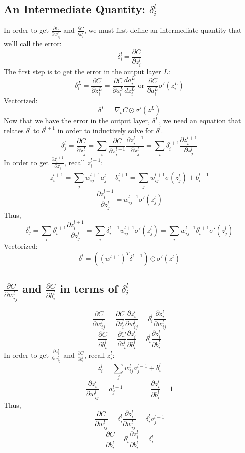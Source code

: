 \documentclass[11pt]{article}
\begin{document}
\subsection{An Intermediate Quantity: $\delta_i^l$}
In order to get $\frac{\partial C}{\partial w_{ij}^l}$ and $\frac{\partial C}{\partial b_i^l}$, we must first define an intermediate quantity that we'll call the error:
\[\delta_i^l = \frac{\partial C}{\partial z_i^l}\]
The first step is to get the error in the output layer $L$:
\[\delta_i^L = \frac{\partial C}{\partial z_i^L} = \frac{\partial C}{\partial a_i^L} \frac{d a_i^L}{d z_i^L} \text{ or } \frac{\partial C}{\partial a_i^L} \sigma'(z_i^L)\]
Vectorized:
\[\delta^L = \nabla_a C \odot \sigma'(z^L)\]
Now that we have the error in the output layer, $\delta^L$, we need an equation that relates $\delta^l$ to $\delta^{l + 1}$ in order to inductively solve for $\delta^l$.
\[\delta_j^l = \frac{\partial C}{\partial z_j^l} = \sum_i \frac{\partial C}{\partial z_i^{l + 1}} \frac{\partial z_i^{l + 1}}{\partial z_j^l} = \sum_i \delta_i^{l + 1} \frac{\partial z_i^{l + 1}}{\partial z_j^l}\]
In order to get $\frac{\partial z_i^{l + 1}}{\partial z_j^l}$, recall $z_i^{l + 1}$:
\[z_i^{l + 1} = \sum_j w_{ij}^{l + 1} a_j^l + b_i^{l + 1} = \sum_j w_{ij}^{l + 1} \sigma(z_j^l) + b_i^{l + 1}\]
\[\frac{\partial z_i^{l + 1}}{\partial z_j^l} = w_{ij}^{l + 1} \sigma'(z_j^l)\]
Thus,
\[\delta_j^l = \sum_i \delta_i^{l + 1} \frac{\partial z_i^{l + 1}}{\partial z_j^l} = \sum_i \delta_i^{l + 1} w_{ij}^{l + 1} \sigma'(z_j^l) = \sum_i w_{ij}^{l + 1} \delta_i^{l + 1} \sigma'(z_j^l)\]
Vectorized:
\[\delta^l = \left(\left(w^{l + 1}\right)^T \delta^{l + 1}\right) \odot \sigma'(z^l)\]

\subsection{$\frac{\partial C}{\partial w_{ij}^l}$ and $\frac{\partial C}{\partial b_i^l}$ in terms of $\delta_i^l$}

\[\frac{\partial C}{\partial w_{ij}^l} = \frac{\partial C}{\partial z_i^l} \frac{\partial z_i^l}{\partial w_{ij}^l} = \delta_i^l \frac{\partial z_i^l}{\partial w_{ij}^l}\]
\[\frac{\partial C}{\partial b_i^l} = \frac{\partial C}{\partial z_i^l} \frac{\partial z_i^l}{\partial b_i^l} = \delta_i^l \frac{\partial z_i^l}{\partial b_i^l}\]
In order to get $\frac{\partial z_i^l}{\partial w_{ij}^l}$ and $\frac{\partial C}{\partial b_i^l}$, recall $z_i^l$:
\[z_i^l = \sum_j w_{ij}^l a_j^{l - 1} + b_i^l\]
\[\frac{\partial z_i^l}{\partial w_{ij}^l} = a_j^{l - 1}
\qquad \qquad 
\frac{\partial z_i^l}{\partial b_i^l} = 1\]
Thus,
\[\frac{\partial C}{\partial w_{ij}^l} = \delta_i^l \frac{\partial z_i^l}{\partial w_{ij}^l} = \delta_i^l a_j^{l - 1}\]
\[\frac{\partial C}{\partial b_i^l} = \delta_i^l \frac{\partial z_i^l}{\partial b_i^l} = \delta_i^l\]
\end{document}
